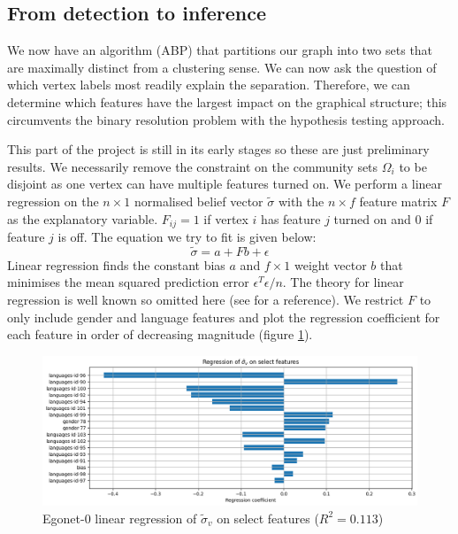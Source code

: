 \documentclass[11pt]{article}
\begin{document}
\begin{multicols*}{2}
\subsection{From detection to inference}
\label{sect:detection-to-inference}

We now have an algorithm (ABP) that partitions our graph into two sets that are maximally distinct from a clustering sense. We can now ask the question of which vertex labels most readily explain the separation. Therefore, we can determine which features have the largest impact on the graphical structure; this circumvents the binary resolution problem with the hypothesis testing approach.

This part of the project is still in its early stages so these are just preliminary results. We necessarily remove the constraint on the community sets $\Omega_i$ to be disjoint as one vertex can have multiple features turned on. We perform a linear regression on the $n \times 1$ normalised belief vector $\tilde{\sigma}$ with the $n \times f$ feature matrix $F$ as the explanatory variable. $F_{ij} = 1$ if vertex $i$ has feature $j$ turned on and $0$ if feature $j$ is off. The equation we try to fit is given below:
%
\begin{equation}
	\tilde{\sigma} = a + F b + \epsilon
	\label{eqn:lin-regression}
\end{equation}
%
Linear regression finds the constant bias $a$ and $f \times 1$ weight vector $b$ that minimises the mean squared prediction error $\epsilon^T \epsilon / n$. The theory for linear regression is well known so omitted here (see \cite{yale-linear-regression} for a reference). We restrict $F$ to only include gender and language features and plot the regression coefficient for each feature in order of decreasing magnitude (figure \ref{fig:abp-output-lin-regression}).
%
\begin{figure}[H]
	\includegraphics[width=\linewidth]{ego-0-abp-lin-regression.png}
	\caption{Egonet-0 linear regression of $\tilde{\sigma}_v$ on select features ($R^2 = 0.113$)}
	\label{fig:abp-output-lin-regression}
\end{figure}


\end{multicols*}
\end{document}
